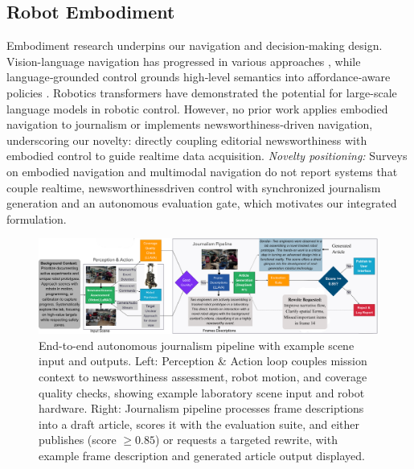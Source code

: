 \documentclass[letterpaper, 10 pt, conference]{ieeeconf}  %
\begin{document}
\subsection{Robot Embodiment}
Embodiment research underpins our navigation and decision‑making design. Vision-language navigation has progressed in various approaches \cite{duet2022}, while language‑grounded control grounds high‑level semantics into affordance‑aware policies \cite{saycan2022}. Robotics transformers \cite{brohan2022rt} have demonstrated the potential for large-scale language models in robotic control. However, no prior work applies embodied navigation to journalism or implements newsworthi\-ness‑driven navigation, underscoring our novelty: directly coupling editorial newsworthi\-ness with embodied control to guide real\-time data acquisition.
\noindent\textit{Novelty positioning:} Surveys on embodied navigation and multi\-modal navigation \cite{liu2025embodiednav,wu2024embodiedsurvey} do not report systems that couple real\-time, newsworthiness\-driven control with synchronized journalism generation and an autonomous evaluation gate, which motivates our integrated formulation.

\begin{figure}[!t]
\centering
\includegraphics[width=\textwidth]{figures/flowchart.png}
\caption{End-to-end autonomous journalism pipeline with example scene input and outputs. Left: Perception \& Action loop couples mission context to newsworthi\-ness assessment, robot motion, and coverage quality checks, showing example laboratory scene input and robot hardware. Right: Journalism pipeline processes frame descriptions into a draft article, scores it with the evaluation suite, and either publishes (score $\ge 0.85$) or requests a targeted rewrite, with example frame description and generated article output displayed.}
\label{fig:flowchart}
\end{figure}
\end{document}
